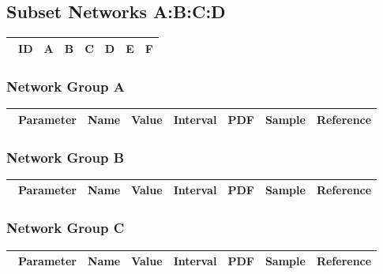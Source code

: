 \documentclass[preprint, 8pt]{elsarticle}
\theoremstyle{definition}
\begin{document}
\subsection{Subset Networks A:B:C:D}

\begin{table}[H]\centering
\begin{tabular}{p{1cm}p{1cm}p{1cm}p{1cm}p{1cm}p{1cm}p{4cm}}\
ID & A & B & C & D & E & F \\
\hline
\hline
\end{tabular}
\end{table}

\subsubsection{Network Group A}

\begin{table}[H]\centering
\begin{tabular}{p{1cm}p{1cm}p{1cm}p{1cm}p{1cm}p{1cm}p{4cm}}\
Parameter & Name & Value & Interval & PDF & Sample & Reference \\
\hline
\hline
\end{tabular}
\end{table}

\subsubsection{Network Group B}

\begin{table}[H]\centering
\begin{tabular}{p{1cm}p{1cm}p{1cm}p{1cm}p{1cm}p{1cm}p{4cm}}\
Parameter & Name & Value & Interval & PDF & Sample & Reference \\
\hline
\hline
\end{tabular}
\end{table}

\subsubsection{Network Group C}

\begin{table}[H]\centering
\begin{tabular}{p{1cm}p{1cm}p{1cm}p{1cm}p{1cm}p{1cm}p{4cm}}\
Parameter & Name & Value & Interval & PDF & Sample & Reference \\
\hline
\hline
\end{tabular}
\end{table}
\end{document}
